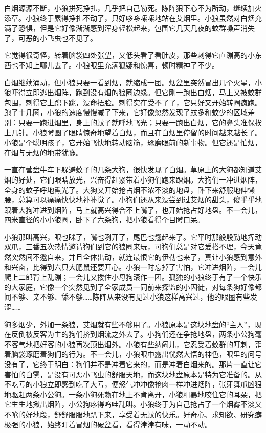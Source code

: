 \par 白烟源源不断，小狼拼死挣扎，几乎把自己勒死。陈阵狠下心不为所动，继续加火添草。小狼终于累得挣扎不动了，只好哆哆嗦嗦地站在艾烟里。小狼虽然对白烟充满了恐惧，但是它好像渐渐感到浑身轻松起来，包围它几天几夜的蚊群噪声消失了，可恶的小飞虫也不见了。
\par 它觉得很奇怪，转着脑袋四处张望，又低头看了看肚皮，那些刺得它直蹦高的小东西也不知上哪儿去了。小狼眼里充满狐疑和惊喜，顿时精神了不少。
\par 白烟继续涌动，但小狼只要一看到烟，就缩成一团。烟盆里突然冒出几个火星，小狼吓得立即逃出烟阵，跑到没有烟的狼圈边缘。但它刚一跑出白烟，马上又被蚊群包围，刺得它上蹿下跳，没命捂脸。刺得实在受不了了，它只好又开始转圈疯跑。跑了十几圈，小狼的速度慢慢减了下来，它好像忽然发现了蚊多和蚊少的区域差别：只要一跑进烟里，身上的蚊子就呼地飞光；只要一跑出白烟，它的鼻头准保挨上几针。小狼瞪圆了眼睛惊奇地望着白烟，而且在白烟里停留的时间越来越长了。小狼是个聪明孩子，它开始飞快地转动脑筋，琢磨眼前的新事物。但它还是怕烟，在烟与无烟的地带犹豫。
\par 一直在营盘牛车下躲避蚊子的几条大狗，很快发现了白烟。草原上的大狗都知道艾烟的好处，它们眼睛放光，兴奋得赶紧带着小狗们跑来蹭烟。大狗们一冲进烟阵，全身的蚊子呼地熏光了。大狗又开始抢占烟不浓不淡的地盘，卧下来舒服地伸懒腰，总算可以痛痛快快地补补觉了。小狗们还从来没尝到过艾烟的甜头，傻乎乎地跟着大狗冲进到烟阵，马上就高兴得合不上嘴了，也开始抢占好地盘。不一会儿，四米直径的小小狼圈，卧下了六条狗，把小狼看得个目瞪口呆。
\par 小狼那叫高兴，眼也眯了，嘴也咧开了，尾巴也翘起来了。它平时那般殷勤地挥动双爪，三番五次热情邀请狗们到它的狼圈来玩，可狗们总是对它爱搭不理，今天竟然突然间不邀自来，并且全体出动，就连最恨它的伊勒也来了，真让小狼感到意外和兴奋，比得到六只大肥鼠还要开心。小狼一时忘掉了害怕，它冲进烟阵，一会儿爬上二郎背上乱蹦；一会儿又搂住小母狗滚作一团。孤独的小狼终于有了一个快乐的大家庭，它像一个突然见到了全家成员一同前来探监的小囚徒，对每条狗好像都闻不够、亲不够、舔不够……陈阵从来没有见过小狼这样高兴过，他的眼圈有些发涩……
\par 狗多烟少，外加一条狼，艾烟就有些不够用了。小狼原本是这块地盘的“主人”，现在反倒被反客为主的狗们挤到烟流之外去了。小狗们还在争抢地盘，两条小公狗毫不客气地把好客的小狼再次顶出烟外。小狼有些纳闷儿，它忍受着蚊群的叮刺，歪着脑袋琢磨着狗们的行为。不一会儿，小狼眼中露出恍然大悟的神色，眼里的问号没有了，它终于明白：狗们并不是冲着它来的，而是冲着白烟来的。那片一直让它害怕的白雾，是没有可恶小飞虫的舒服天地，而这块地盘原本是特为它准备的。从不吃亏的小狼立即感到吃了大亏，便怒气冲冲像抢肉一样冲进烟阵，张牙舞爪凶狠地驱赶两条小公狗。一条小狗死赖在地上不肯离开，小狼粗暴地咬住它的耳朵，把它生生地揪出烟阵，小公狗疼得呜哇乱叫。小狼终于为自己抢占了一个烟雾不淡又不呛的好地段，舒舒服服地趴下来，享受着无蚊的快乐。好奇心、求知欲、研究癖极强的小狼，始终盯着冒烟的破盆看，看得津津有味，一动不动。
